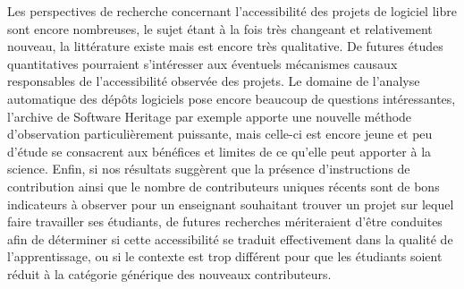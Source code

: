 \documentclass[dvipsnames]{llncs}
\begin{document}
    Les perspectives de recherche concernant l'accessibilité des projets de logiciel libre sont encore
    nombreuses, le sujet étant à la fois très changeant et relativement nouveau, la littérature existe mais
    est encore très qualitative. De futures études quantitatives pourraient s'intéresser aux éventuels
    mécanismes causaux responsables de l'accessibilité observée des projets. Le domaine de l'analyse
    automatique des dépôts logiciels pose encore beaucoup de questions intéressantes, l'archive de Software
    Heritage par exemple apporte une nouvelle méthode d'observation particulièrement puissante, mais celle-ci
    est encore jeune et peu d'étude se consacrent aux bénéfices et limites de ce qu'elle peut apporter à la
    science. Enfin, si nos résultats suggèrent que la présence d'instructions de contribution ainsi que le
    nombre de contributeurs uniques récents sont de bons indicateurs à observer pour un enseignant souhaitant
    trouver un projet sur lequel faire travailler ses étudiants, de futures recherches mériteraient d'être
    conduites afin de déterminer si cette accessibilité se traduit effectivement dans la qualité de
    l'apprentissage, ou si le contexte est trop différent pour que les étudiants soient réduit à la catégorie
    générique des nouveaux contributeurs.

    \printbibliography[heading=bibintoc]
\end{document}
